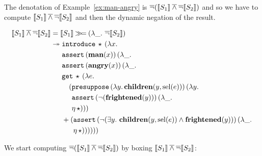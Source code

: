 The denotation of Example~\ref{ex:man-angry} is
$\mathop{\overline{\lnot}} (\llbracket S_1 \rrbracket \mathbin{\overline{\land}} \mathop{\overline{\lnot}} \llbracket S_2 \rrbracket)$ and so we have to compute
$\llbracket S_1 \rrbracket \mathbin{\overline{\land}} \mathop{\overline{\lnot}} \llbracket S_2 \rrbracket$ and then the dynamic negation of the
result.

\begin{align*}
  \llbracket S_1 \rrbracket \mathbin{\overline{\land}} \mathop{\overline{\lnot}} \llbracket S_2 \rrbracket
  &= \llbracket S_1 \rrbracket \mathbin{\gg\!=} (\lambda \_.\, \mathop{\overline{\lnot}} \llbracket S_2 \rrbracket) \\
  &\twoheadrightarrow \begin{aligned}[t]
      &\mathtt{introduce}\,\star\,(\lambda x.\,  \\
      &\mathtt{assert}\,(\textbf{man}(x))\,(\lambda \_.\,  \\
      &\mathtt{assert}\,(\textbf{angry}(x))\,(\lambda \_.\,  \\
      &\mathtt{get}\,\star\,(\lambda e.\,  \\
      &\quad \begin{aligned}[t]
          (&\mathtt{presuppose}\,(\lambda y.\, \textbf{children}(y, \operatorname{sel}(e)))\,(\lambda y.\,  \\
           &\mathtt{assert}\,(\lnot (\textbf{frightened}(y)))\,(\lambda \_.\,  \\
           &\eta\,\star)))
         \end{aligned} \\
      &+ \begin{aligned}[t]
          (&\mathtt{assert}\,(\lnot (\exists y.\ \textbf{children}(y, \operatorname{sel}(e)) \land \textbf{frightened}(y)))\,(\lambda \_.\,  \\
           &\eta\,\star))))))
         \end{aligned}
    \end{aligned}
\end{align*}

We start computing $\mathop{\overline{\lnot}} (\llbracket S_1 \rrbracket \mathbin{\overline{\land}} \mathop{\overline{\lnot}} \llbracket S_2 \rrbracket)$ by boxing
$\llbracket S_1 \rrbracket \mathbin{\overline{\land}} \mathop{\overline{\lnot}} \llbracket S_2 \rrbracket$:

